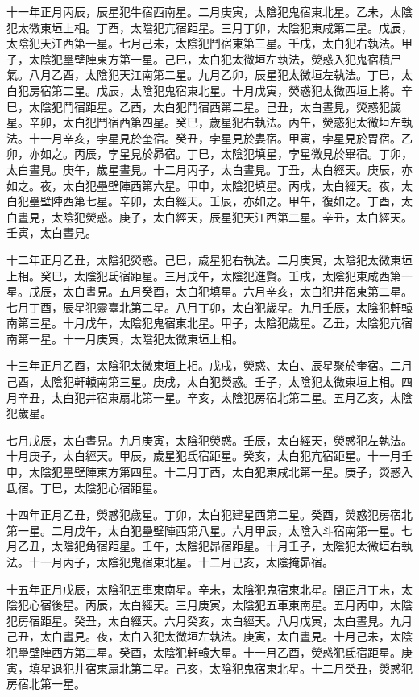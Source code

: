 \begin{pinyinscope}
 十一年正月丙辰，辰星犯牛宿西南星。二月庚寅，太陰犯鬼宿東北星。乙未，太陰犯太微東垣上相。丁酉，太陰犯亢宿距星。三月丁卯，太陰犯東咸第二星。戊辰，太陰犯天江西第一星。七月己未，太陰犯鬥宿東第三星。壬戌，太白犯右執法。甲子，太陰犯壘壁陣東方第一星。己巳，太白犯太微垣左執法，熒惑入犯鬼宿積尸氣。八月乙酉，太陰犯天江南第二星。九月乙卯，辰星犯太微垣左執法。丁巳，太白犯房宿第二星。戊辰，太陰犯鬼宿東北星。十月戊寅，熒惑犯太微西垣上將。辛巳，太陰犯鬥宿距星。乙酉，太白犯鬥宿西第二星。己丑，太白晝見，熒惑犯歲星。辛卯，太白犯鬥宿西第四星。癸巳，歲星犯右執法。丙午，熒惑犯太微垣左執法。十一月辛亥，孛星見於奎宿。癸丑，孛星見於婁宿。甲寅，孛星見於胃宿。乙卯，亦如之。丙辰，孛星見於昴宿。丁巳，太陰犯填星，孛星微見於畢宿。丁卯，太白晝見。庚午，歲星晝見。十二月丙子，太白晝見。丁丑，太白經天。庚辰，亦如之。夜，太白犯壘壁陣西第六星。甲申，太陰犯填星。丙戌，太白經天。夜，太白犯壘壁陣西第七星。辛卯，太白經天。壬辰，亦如之。甲午，復如之。丁酉，太白晝見，太陰犯熒惑。庚子，太白經天，辰星犯天江西第二星。辛丑，太白經天。壬寅，太白晝見。



 十二年正月乙丑，太陰犯熒惑。己巳，歲星犯右執法。二月庚寅，太陰犯太微東垣上相。癸巳，太陰犯氐宿距星。三月戊午，太陰犯進賢。壬戌，太陰犯東咸西第一星。戊辰，太白晝見。五月癸酉，太白犯填星。六月辛亥，太白犯井宿東第二星。七月丁酉，辰星犯靈臺北第二星。八月丁卯，太白犯歲星。九月壬辰，太陰犯軒轅南第三星。十月戊午，太陰犯鬼宿東北星。甲子，太陰犯歲星。乙丑，太陰犯亢宿南第一星。十一月庚寅，太陰犯太微東垣上相。



 十三年正月乙酉，太陰犯太微東垣上相。戊戌，熒惑、太白、辰星聚於奎宿。二月己酉，太陰犯軒轅南第三星。庚戌，太白犯熒惑。壬子，太陰犯太微東垣上相。四月辛丑，太白犯井宿東扇北第一星。辛亥，太陰犯房宿北第二星。五月乙亥，太陰犯歲星。



 七月戊辰，太白晝見。九月庚寅，太陰犯熒惑。壬辰，太白經天，熒惑犯左執法。十月庚子，太白經天。甲辰，歲星犯氐宿距星。癸亥，太白犯亢宿距星。十一月壬申，太陰犯壘壁陣東方第四星。十二月丁酉，太白犯東咸北第一星。庚子，熒惑入氐宿。丁巳，太陰犯心宿距星。



 十四年正月乙丑，熒惑犯歲星。丁卯，太白犯建星西第二星。癸酉，熒惑犯房宿北第一星。二月戊午，太白犯壘壁陣西第八星。六月甲辰，太陰入斗宿南第一星。七月乙丑，太陰犯角宿距星。壬午，太陰犯昴宿距星。十月壬子，太陰犯太微垣右執法。十一月丙子，太陰犯鬼宿東北星。十二月己亥，太陰掩昴宿。



 十五年正月戊辰，太陰犯五車東南星。辛未，太陰犯鬼宿東北星。閏正月丁未，太陰犯心宿後星。丙辰，太白經天。三月庚寅，太陰犯五車東南星。五月丙申，太陰犯房宿距星。癸丑，太白經天。六月癸亥，太白經天。八月戊寅，太白晝見。九月己丑，太白晝見。夜，太白入犯太微垣左執法。庚寅，太白晝見。十月己未，太陰犯壘壁陣西方第二星。癸酉，太陰犯軒轅大星。十一月乙酉，熒惑犯氐宿距星。庚寅，填星退犯井宿東扇北第二星。己亥，太陰犯鬼宿東北星。十二月癸丑，熒惑犯房宿北第一星。




\end{pinyinscope}
